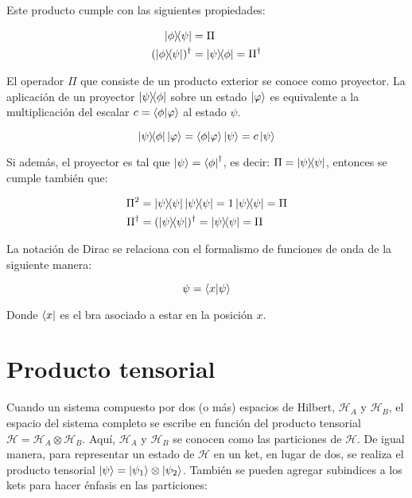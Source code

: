 Este producto cumple con las siguientes propiedades:

\begin{align}
    \ketbra{\phi}{\psi} &= \Pi \\
    (\ketbra{\phi}{\psi})^\dagger &= \ketbra{\psi}{\phi} = \Pi^\dagger
\end{align}

El operador $\Pi$ que consiste de un producto exterior se conoce como proyector. La aplicación de un proyector $\ketbra{\psi}{\phi}$ sobre un estado $\ket{\varphi}$ es equivalente a la multiplicación del escalar $c = \braket{\phi}{\varphi}$ al estado $\psi$.

\begin{equation}
    \ketbra{\psi}{\phi} \ket{\varphi} = \braket{\phi}{\varphi} \ket{\psi} = c \ket{\psi}
\end{equation}

Si además, el proyector es tal que $\ket{\psi} = \bra{\phi}^\dagger$, es decir: $\Pi = \ketbra{\psi}{\psi}$, entonces se cumple también que:

\begin{align}
    \Pi^2 &= \ketbra{\psi}{\psi} \ketbra{\psi}{\psi} = 1 \ketbra{\psi}{\psi} = \Pi \\
    \Pi^\dagger &= (\ketbra{\psi}{\psi})^\dagger = \ketbra{\psi}{\psi} = \Pi
\end{align}

La notación de Dirac se relaciona con el formalismo de funciones de onda de la siguiente manera:

\begin{equation}
    \psi = \braket{x}{\psi}
\end{equation}

Donde $\bra{x}$ es el bra asociado a estar en la posición $x$.

\section{Producto tensorial}

Cuando un sistema compuesto por dos (o más) espacios de Hilbert, $\mathcal{H}_A$ y $\mathcal{H}_B$, el espacio del sistema completo se escribe en función del producto tensorial $\mathcal{H} = \mathcal{H}_A \otimes \mathcal{H}_B$. Aquí, $\mathcal{H}_A$ y $\mathcal{H}_B$ se conocen como las particiones de $\mathcal{H}$. De igual manera, para representar un estado de $\mathcal{H}$ en un ket, en lugar de dos, se realiza el producto tensorial $\ket{\psi} = \ket{\psi_1} \otimes \ket{\psi_2}$. También se pueden agregar subindices a los kets para hacer énfasis en las particiones:

